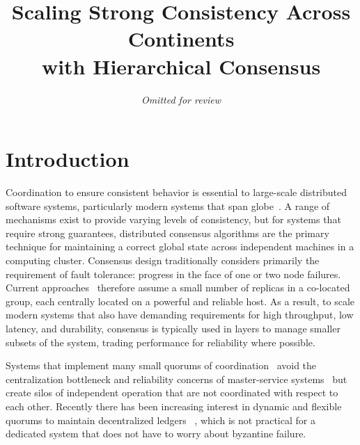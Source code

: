 \documentclass[10pt,twocolumn]{article}
\begin{document}
\title{\bf Scaling Strong Consistency Across Continents\\
with Hierarchical Consensus}
\author{\emph{Omitted for review}}
\date{}

\maketitle

\thispagestyle{empty}

\begin{abstract}
    
\end{abstract}

\section*{Introduction}

Coordination to ensure consistent behavior is essential to large-scale
distributed software systems, particularly modern systems that span
globe~\cite{spanner,mdcc,calvinfs,alvaro2013consistency}.
A range of mechanisms exist to provide varying levels of consistency, but
for systems that require strong guarantees, distributed consensus algorithms
are the primary technique for maintaining a correct global state across
independent machines in a computing cluster.
Consensus design traditionally considers primarily the requirement of
fault tolerance: progress in the face of one or two node failures.
Current approaches~\cite{mencius,epaxos,multicoordinated_paxos,spaxos}
therefore assume a small number of replicas in a co-located group, each
centrally located on a powerful and reliable host.
As a result, to scale modern systems that also have demanding requirements
for high throughput, low latency, and durability, consensus is typically used
in layers to manage smaller subsets of the system, trading performance for
reliability where possible.


Systems that implement many small quorums of
coordination~\cite{mdcc,scatter,spanner} avoid the centralization bottleneck
and reliability concerns of master-service
systems~\cite{gray_dangers_1996,gfs} but create silos of independent
operation that are not coordinated with respect to each other.
Recently there has been increasing interest in dynamic and flexible quorums
to maintain decentralized ledgers~\cite{stellar} , which is not practical for a dedicated system that
does not have to worry about byzantine failure.
\end{document}

